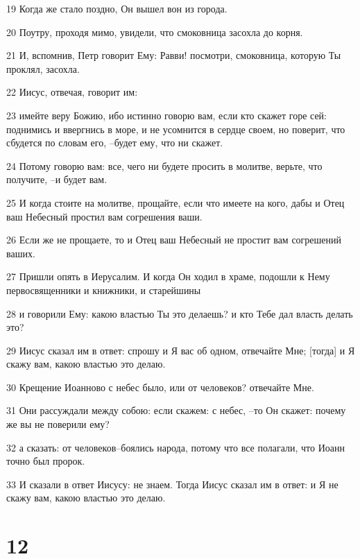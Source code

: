 \par 19 Когда же стало поздно, Он вышел вон из города.
\par 20 Поутру, проходя мимо, увидели, что смоковница засохла до корня.
\par 21 И, вспомнив, Петр говорит Ему: Равви! посмотри, смоковница, которую Ты проклял, засохла.
\par 22 Иисус, отвечая, говорит им:
\par 23 имейте веру Божию, ибо истинно говорю вам, если кто скажет горе сей: поднимись и ввергнись в море, и не усомнится в сердце своем, но поверит, что сбудется по словам его, --будет ему, что ни скажет.
\par 24 Потому говорю вам: все, чего ни будете просить в молитве, верьте, что получите, --и будет вам.
\par 25 И когда стоите на молитве, прощайте, если что имеете на кого, дабы и Отец ваш Небесный простил вам согрешения ваши.
\par 26 Если же не прощаете, то и Отец ваш Небесный не простит вам согрешений ваших.
\par 27 Пришли опять в Иерусалим. И когда Он ходил в храме, подошли к Нему первосвященники и книжники, и старейшины
\par 28 и говорили Ему: какою властью Ты это делаешь? и кто Тебе дал власть делать это?
\par 29 Иисус сказал им в ответ: спрошу и Я вас об одном, отвечайте Мне; [тогда] и Я скажу вам, какою властью это делаю.
\par 30 Крещение Иоанново с небес было, или от человеков? отвечайте Мне.
\par 31 Они рассуждали между собою: если скажем: с небес, --то Он скажет: почему же вы не поверили ему?
\par 32 а сказать: от человеков--боялись народа, потому что все полагали, что Иоанн точно был пророк.
\par 33 И сказали в ответ Иисусу: не знаем. Тогда Иисус сказал им в ответ: и Я не скажу вам, какою властью это делаю.

\chapter{12}

